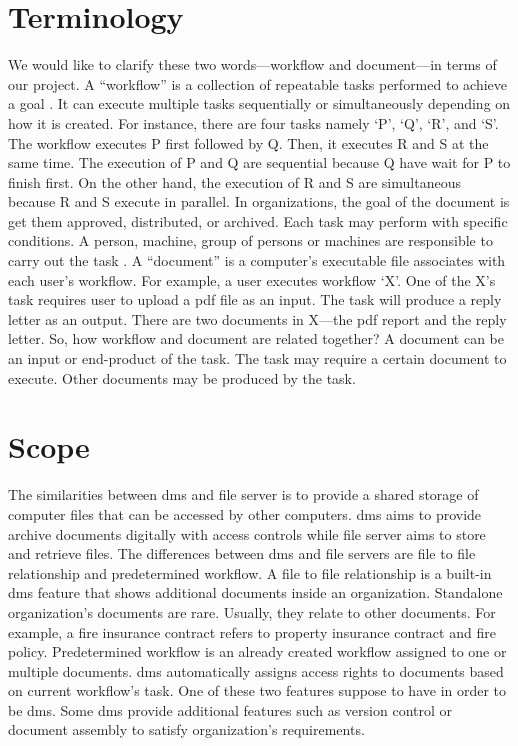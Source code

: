 \section{Terminology}
\label{sec:terminology}
We would like to clarify these two words---workflow and document---in terms of our project. %
A \enquote{workflow} is a collection of repeatable tasks performed to achieve a goal \cite{Jablonski:1996:WMM}.
It can execute multiple tasks sequentially or simultaneously depending on how it is created.
For instance, there are four tasks namely \enquote*{P}, \enquote*{Q}, \enquote*{R}, and \enquote*{S}.
The workflow executes P first followed by Q.
Then, it executes R and S at the same time.
The execution of P and Q are sequential because Q have wait for P to finish first.
On the other hand, the execution of R and S are simultaneous because R and S execute in parallel.
In organizations, the goal of the document is get them approved, distributed, or archived.
Each task may perform with specific conditions.
A person, machine, group of persons or machines are responsible to carry out the task \cite{wfMangement}. 
A \enquote{document} is a computer's executable file associates with each user's workflow.
For example, a user executes workflow \enquote*{X}.
One of the X's task requires user to upload a \gls{pdf} file as an input.
The task will produce a reply letter as an output.
There are two documents in X---the \gls{pdf} report and the reply letter.
So, how workflow and document are related together?
A document can be an input or end-product of the task.
The task may require a certain document to execute.
Other documents may be produced by the task.


\section{Scope}
\label{sec:scope}
The similarities between \gls{dms} and file server is to provide a shared storage of computer files that can be accessed by other computers.
\gls{dms} aims to provide archive documents digitally with access controls while file server aims to store and retrieve files.
The differences between \gls{dms} and file servers are file to file relationship and predetermined workflow.
A file to file relationship is a built-in \gls{dms} feature that shows additional documents inside an organization.
Standalone organization's documents are rare.
Usually, they relate to other documents.
For example, a fire insurance contract refers to property insurance contract and fire policy.
Predetermined workflow is an already created workflow assigned to one or multiple documents.
\gls{dms} automatically assigns access rights to documents based on current workflow's task.
One of these two features suppose to have in order to be \gls{dms}.
Some \gls{dms} provide additional features such as version control or document assembly to satisfy organization's requirements.

